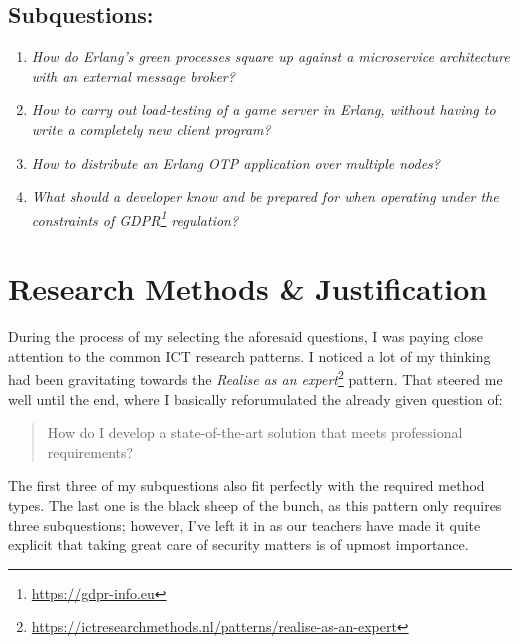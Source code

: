 \documentclass{article}
\begin{document}
    \subsection{Subquestions:}
    \label{section:subquestions}
    \begin{enumerate}
        \item \textit{How do Erlang's green processes square up against a microservice architecture with an external message broker?} \label{subquestion:erlang-processes}
        \item \textit{How to carry out load-testing of a game server in Erlang, without having to write a completely new client program?} \label{subquestion:load-testing}
        \item \textit{How to distribute an Erlang OTP application over multiple nodes?} \label{subquestion:distribution}
        \item \textit{What should a developer know and be prepared for when operating under the constraints of GDPR\footnote{\url{https://gdpr-info.eu}} regulation?} \label{subquestion:gdpr}
    \end{enumerate}

\newpage
\section{Research Methods \& Justification}
\label{section:research-methods-and-justification}
    During the process of my selecting the aforesaid questions, I was paying close attention to the common ICT research patterns. I noticed a lot of my thinking had been gravitating towards the \textit{Realise as an expert}\footnote{\url{https://ictresearchmethods.nl/patterns/realise-as-an-expert}} pattern. That steered me well until the end, where I basically reforumulated the already given question of:
    \begin{quote}
        How do I develop a state-of-the-art solution that meets professional requirements?
    \end{quote}
    The first three of my subquestions also fit perfectly with the required method types. The last one is the black sheep of the bunch, as this pattern only requires three subquestions; however, I've left it in as our teachers have made it quite explicit that taking great care of security matters is of upmost importance.
\end{document}
